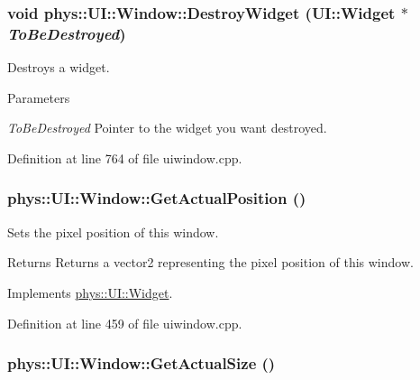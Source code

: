 \hypertarget{classphys_1_1UI_1_1Window_ab4bda54a82b64aec2cf4e03201a40772}{
\subsubsection[{DestroyWidget}]{\setlength{\rightskip}{0pt plus 5cm}void phys::UI::Window::DestroyWidget ({\bf UI::Widget} $\ast$ {\em ToBeDestroyed})}}
\label{d4/d86/classphys_1_1UI_1_1Window_ab4bda54a82b64aec2cf4e03201a40772}


Destroys a widget. 


\begin{DoxyParams}{Parameters}
\item[{\em ToBeDestroyed}]Pointer to the widget you want destroyed. \end{DoxyParams}


Definition at line 764 of file uiwindow.cpp.

\hypertarget{classphys_1_1UI_1_1Window_a811fb495bc698752e03778b18f2b1a30}{
\subsubsection[{GetActualPosition}]{ phys::UI::Window::GetActualPosition ()}}
\label{d4/d86/classphys_1_1UI_1_1Window_a811fb495bc698752e03778b18f2b1a30}


Sets the pixel position of this window. 

\begin{DoxyReturn}{Returns}
Returns a vector2 representing the pixel position of this window. 
\end{DoxyReturn}


Implements \hyperlink{classphys_1_1UI_1_1Widget_a0a29fecff7f56d7909f65fd63b0990e7}{phys::UI::Widget}.



Definition at line 459 of file uiwindow.cpp.

\hypertarget{classphys_1_1UI_1_1Window_a22f5ca800e44c5e2cfeed59c243b03ed}{
\subsubsection[{GetActualSize}]{ phys::UI::Window::GetActualSize ()}}
\label{d4/d86/classphys_1_1UI_1_1Window_a22f5ca800e44c5e2cfeed59c243b03ed}


